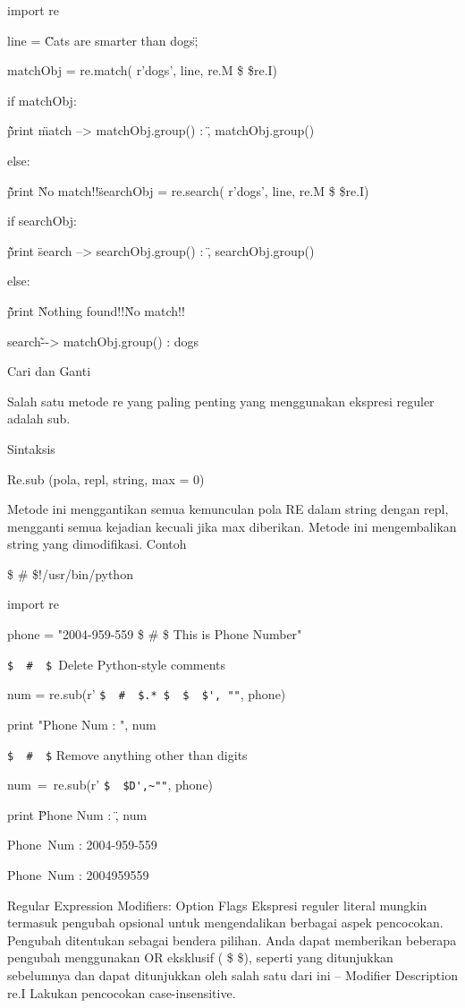\begin {enumerate}
\begin {enumerate}
import re

line = \"Cats are smarter than dogs\";

matchObj = re.match( r'dogs', line, re.M \$   \$re.I)

if matchObj:

\~\~ print \"match --> matchObj.group() : \", matchObj.group()

else:

\~\~ print \"No match!!\"

searchObj = re.search( r'dogs', line, re.M \$    \$re.I)

if searchObj:

\~\~ print \"search --> searchObj.group() : \", searchObj.group()

else:

\~\~ print \"Nothing found!!\"

No match!!

search\~--> matchObj.group() :  dogs

Cari dan Ganti

Salah satu metode re yang paling penting yang menggunakan ekspresi reguler adalah sub.

Sintaksis

Re.sub (pola, repl, string, max = 0)

Metode ini menggantikan semua kemunculan pola RE dalam string dengan repl, mengganti semua kejadian kecuali jika max diberikan. Metode ini mengembalikan string yang dimodifikasi.
Contoh

 \$  \#  \$!/usr/bin/python

import re

phone = "2004-959-559  \$  \#  \$ This is Phone Number"

 \verb|$  #  $ |Delete Python-style comments

num = re.sub(r' \verb|$  #  $.* $  $  $', ""|, phone)

print "Phone Num : ", num

 \verb|$  #  $| Remove anything other than digits

num~=~re.sub(r' \verb|$  $D',~""|, phone)

print \"Phone Num : \", num

Phone~Num :  2004-959-559

Phone~Num :  2004959559

Regular Expression Modifiers: Option Flags
Ekspresi reguler literal mungkin termasuk pengubah opsional untuk mengendalikan berbagai aspek pencocokan. Pengubah ditentukan sebagai bendera pilihan. Anda dapat memberikan beberapa pengubah menggunakan OR eksklusif ( \$   \$), seperti yang ditunjukkan sebelumnya dan dapat ditunjukkan oleh salah satu dari ini – Modifier Description
re.I
Lakukan pencocokan case-insensitive.


\end{enumerate}
\end{enumerate}
